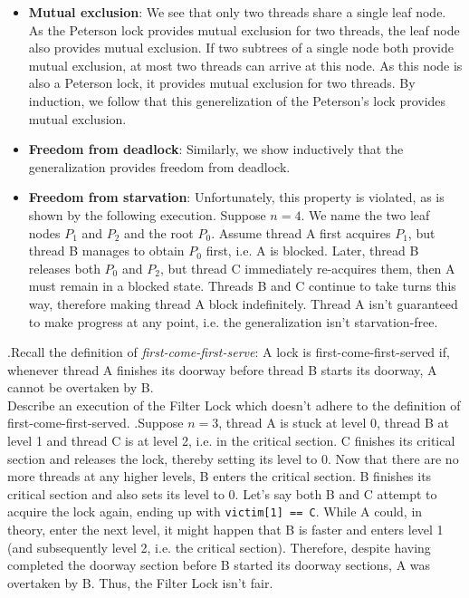 \documentclass[main]{subfiles}
\begin{document}
\begin{ExerciseList}
            \Question
                \begin{itemize}
                    \item \textbf{Mutual exclusion}: We see that only two threads share a single leaf node. As the Peterson lock provides mutual exclusion for two threads, the leaf node also provides mutual exclusion. If two subtrees of a single node both provide mutual exclusion, at most two threads can arrive at this node. As this node is also a Peterson lock, it provides mutual exclusion for two threads. By induction, we follow that this generelization of the Peterson's lock provides mutual exclusion.
                    \item \textbf{Freedom from deadlock}: Similarly, we show inductively that the generalization provides freedom from deadlock.
                    \item \textbf{Freedom from starvation}: Unfortunately, this property is violated, as is shown by the following execution. Suppose $n = 4$. We name the two leaf nodes $P_1$ and $P_2$ and the root $P_0$. Assume thread A first acquires $P_1$, but thread B manages to obtain $P_0$ first, i.e. A is blocked. Later, thread B releases both $P_0$ and $P_2$, but thread C immediately re-acquires them, then A must remain in a blocked state. Threads B and C continue to take turns this way, therefore making thread A block indefinitely. Thread A isn't guaranteed to make progress at any point, i.e. the generalization isn't starvation-free.
                \end{itemize}
        
        
        \Exercise[title={Fairness},label=Filter].\quad Recall the definition of \textit{first-come-first-serve}: A lock is first-come-first-served if, whenever thread A finishes its doorway before thread B starts its doorway, A cannot be overtaken by B. \\[3mm]
        Describe an execution of the Filter Lock which doesn't adhere to the definition of first-come-first-served.
        \Answer[ref={Filter}].\quad Suppose $n = 3$, thread A is stuck at level 0, thread B at level 1 and thread C is at level 2, i.e. in the critical section. C finishes its critical section and releases the lock, thereby setting its level to 0. Now that there are no more threads at any higher levels, B enters the critical section. B finishes its critical section and also sets its level to 0. Let's say both B and C attempt to acquire the lock again, ending up with \texttt{victim[1] == C}. While A could, in theory, enter the next level, it might happen that B is faster and enters level 1 (and subsequently level 2, i.e. the critical section). Therefore, despite having completed the doorway section before B started its doorway sections, A was overtaken by B. Thus, the Filter Lock isn't fair.
        

\end{ExerciseList}
\end{document}
